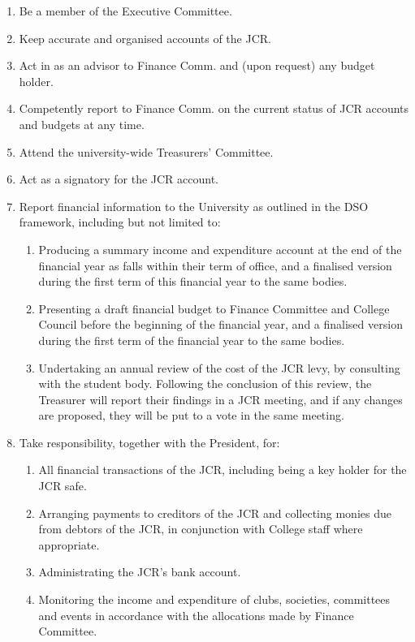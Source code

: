 \begin{enumerate}
    \item Be a member of the Executive Committee.
    \item Keep accurate and organised accounts of the JCR.
    \item Act in as an advisor to Finance Comm. and (upon request) any budget holder.
    \item Competently report to Finance Comm. on the current status of JCR accounts and budgets at any time.
    \item Attend the university-wide Treasurers’ Committee.
    \item Act as a signatory for the JCR account.
    \item Report financial information to the University as outlined in the DSO framework, including but not limited to: 
        \begin{enumerate}
            \item Producing a summary income and expenditure account at the end of the financial year as falls within their term of office, and a finalised version during the first term of this financial year to the same bodies. 
            \item Presenting a draft financial budget to Finance Committee and College Council before the beginning of the financial year, and a finalised version during the first term of the financial year to the same bodies. 
            \item Undertaking an annual review of the cost of the JCR levy, by consulting with the student body. Following the conclusion of this review, the Treasurer will report their findings in a JCR meeting, and if any changes are proposed, they will be put to a vote in the same meeting. 
        \end{enumerate}
    \item Take responsibility, together with the President, for:
        \begin{enumerate}
            \item All financial transactions of the JCR, including being a key holder for the JCR safe. 
            \item Arranging payments to creditors of the JCR and collecting monies due from debtors of the JCR, in conjunction with College staff where appropriate.
            \item Administrating the JCR’s bank account.
            \item Monitoring the income and expenditure of clubs, societies, committees and events in accordance with the allocations made by Finance Committee.

\end{enumerate}
\end{enumerate}

